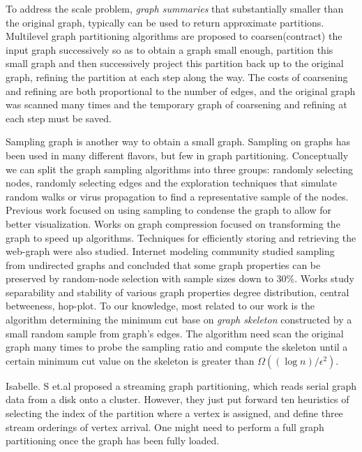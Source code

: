 \documentclass{sig-alternate-2013}
\begin{document}
To address the scale problem, \emph{graph summaries} that substantially smaller than the original graph, typically can be used to return approximate partitions. Multilevel graph partitioning algorithms \cite{Lang:multilevel, Teng:multilevel, Dhillon:multilevel} are proposed  to coarsen(contract) the input graph successively so as to obtain a graph small enough, partition this small graph and then successively project this partition back up to the original graph, refining the partition at each step along the way. The costs of coarsening and refining are both proportional to the number of edges, and the original graph was scanned many times and the temporary graph of coarsening and refining at each step must be saved.

Sampling graph is another way to obtain a small graph. Sampling on graphs has been used in many different flavors, but few in graph partitioning. Conceptually we can split the graph sampling algorithms into three groups: randomly selecting nodes, randomly selecting edges and the exploration techniques that simulate random walks or virus propagation to find a representative sample of the nodes\cite{DBLP:conf/kdd/LeskovecF06}. Previous work focused on using sampling to condense the graph to allow for better visualization. Works on graph compression focused on transforming the graph to speed up algorithms. Techniques for efficiently storing and retrieving the web-graph were also studied. Internet modeling community studied sampling from undirected graphs and concluded that some graph properties can be preserved by random-node selection with sample sizes down to 30\%.  Works study separability and stability of various graph properties degree distribution, central betweeness, hop-plot\cite{DBLP:conf/kdd/LeskovecF06}. To our knowledge, most related to our work is the algorithm determining the minimum cut base on \emph{graph skeleton} constructed by a small random sample from graph's edges\cite{Karger:mincut}. The algorithm need scan the original graph many times to probe the sampling ratio and compute the skeleton until a certain minimum cut value on the skeleton is greater than $\Omega((\log n)/\epsilon^2)$.

Isabelle. S et.al\cite{Stanton:streampartition} proposed a streaming graph partitioning, which reads serial graph data from a disk onto a cluster. However, they just put forward ten heuristics of selecting the index of the partition where a vertex is assigned, and define three stream orderings of vertex arrival. One might need to perform a full graph partitioning once the graph has been fully loaded.
\end{document}
